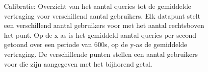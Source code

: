 \begin{figure}[h!] 
\centering
	\caption{Calibratie: Overzicht van het aantal queries tot de gemiddelde vertraging voor verschillend aantal gebruikers. Elk datapunt stelt een verschillend aantal gebruikers voor met het aantal rechtsboven het punt. \newline
	Op de x-as is het gemiddeld aantal queries per second getoond over een periode van 600s, op de y-as de gemiddelde vertraging. De verschillende punten stellen een aantal gebruikers voor die zijn aangegeven met het bijhorend getal.  }
	\label{fig:calibratie-gebruikers-resultaat}
\end{figure}

